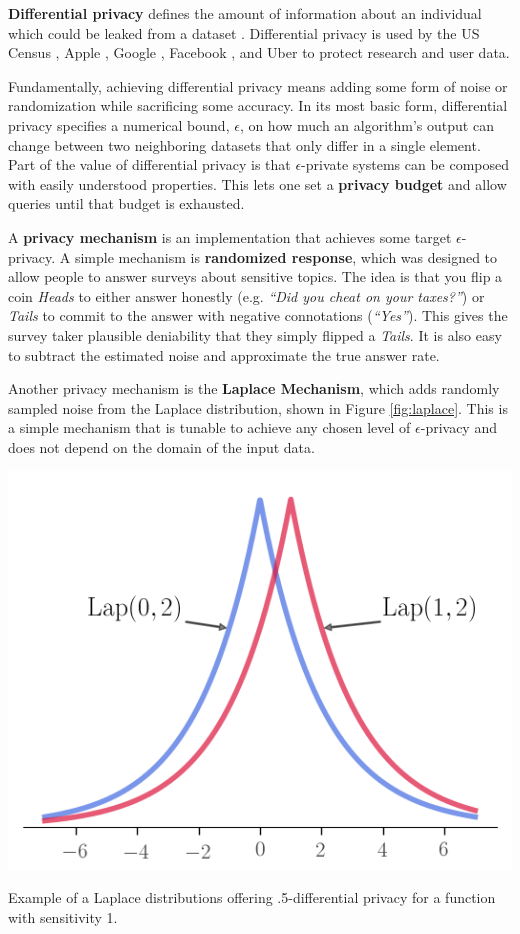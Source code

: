 \documentclass[nobib]{tufte-handout}
\begin{document}
\textbf{Differential privacy} defines the amount of information about an
individual which could be leaked from a dataset \cite{dwork2014algorithmic}.
Differential privacy is used by the US Census \cite{census-differential-privacy},
Apple \cite{apple-differential-privacy}, Google \cite{google-differential-privacy},
Facebook \cite{facebook-url-release}, and Uber \cite{uber-differential-privacy}
to protect research and user data.

Fundamentally, achieving differential privacy means adding some form of noise or
randomization while sacrificing some accuracy. In its most basic form,
differential privacy specifies a numerical bound, $\epsilon$, on how much an
algorithm’s output can change between two neighboring datasets that only differ
in a single element. Part of the value of differential privacy is that
$\epsilon$-private systems can be composed with easily understood properties.
This lets one set a \textbf{privacy budget} and allow queries until that budget
is exhausted.

A \textbf{privacy mechanism} is an implementation that achieves some target
$\epsilon$-privacy. A simple mechanism is \textbf{randomized response}, which
was designed to allow people to answer surveys about sensitive topics. The idea
is that you flip a coin \textit{Heads} to either answer honestly (e.g. \textit{“Did you
cheat on your taxes?”}) or \textit{Tails} to commit to the answer with negative
connotations (\textit{“Yes”}). This gives the survey taker plausible deniability
that they simply flipped a \textit{Tails}. It is also easy to subtract the
estimated noise and approximate the true answer rate.

Another privacy mechanism is the \textbf{Laplace Mechanism}, which adds randomly
sampled noise from the Laplace distribution, shown in Figure \ref{fig:laplace}.
This is a simple mechanism that is tunable to achieve any chosen level of
$\epsilon$-privacy and does not depend on the domain of the input data.

\begin{marginfigure} \includegraphics[width=\linewidth]{laplace}
\caption{Example of a Laplace distributions offering .5-differential privacy for
a function with sensitivity 1.} \label{fig:laplace} \end{marginfigure}
\end{document}
